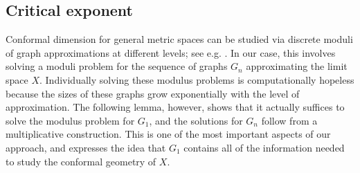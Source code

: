 \documentclass{amsart}
\numberwithin{equation}{section}
\theoremstyle{definition}
\theoremstyle{remark}
\begin{document}
\subsection{Critical exponent} 
Conformal dimension for general metric spaces can be studied via discrete moduli of graph approximations at different levels; see e.g. \cite{Carrasco,KL,Shaconf,MT}. In our case, this involves solving a moduli problem for the sequence of graphs $G_n$ approximating the limit space $X$. Individually solving these modulus problems is computationally hopeless because the sizes of these graphs grow exponentially with the level of approximation. The following lemma, however, shows that it actually suffices to solve the modulus problem for $G_1$, and the solutions for $G_n$ follow from a multiplicative construction. This is one of the most important aspects of our approach, and expresses the idea that $G_1$ contains all of the information needed to study the conformal geometry of $X$.
\end{document}
